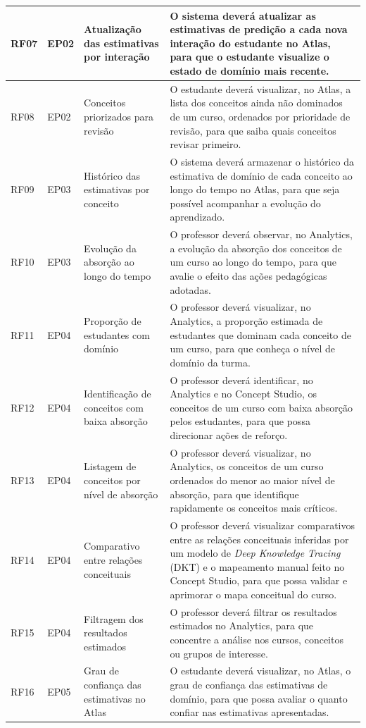 {\begin{longtable}{>{\raggedright\arraybackslash}p{1.4cm}>{\raggedright\arraybackslash}p{2.0cm}>{\raggedright\arraybackslash}p{3.4cm}>{\raggedright\arraybackslash}p{7.0cm}}
\hline
RF07 & EP02 & Atualização das estimativas por interação & O sistema deverá atualizar as estimativas de predição a cada nova interação do estudante no Atlas, para que o estudante visualize o estado de domínio mais recente. \\
\hline
RF08 & EP02 & Conceitos priorizados para revisão & O estudante deverá visualizar, no Atlas, a lista dos conceitos ainda não dominados de um curso, ordenados por prioridade de revisão, para que saiba quais conceitos revisar primeiro. \\
\hline
RF09 & EP03 & Histórico das estimativas por conceito & O sistema deverá armazenar o histórico da estimativa de domínio de cada conceito ao longo do tempo no Atlas, para que seja possível acompanhar a evolução do aprendizado. \\
\hline
RF10 & EP03 & Evolução da absorção ao longo do tempo & O professor deverá observar, no Analytics, a evolução da absorção dos conceitos de um curso ao longo do tempo, para que avalie o efeito das ações pedagógicas adotadas. \\
\hline
RF11 & EP04 & Proporção de estudantes com domínio & O professor deverá visualizar, no Analytics, a proporção estimada de estudantes que dominam cada conceito de um curso, para que conheça o nível de domínio da turma. \\
\hline
RF12 & EP04 & Identificação de conceitos com baixa absorção & O professor deverá identificar, no Analytics e no Concept Studio, os conceitos de um curso com baixa absorção pelos estudantes, para que possa direcionar ações de reforço. \\
\hline
RF13 & EP04 & Listagem de conceitos por nível de absorção & O professor deverá visualizar, no Analytics, os conceitos de um curso ordenados do menor ao maior nível de absorção, para que identifique rapidamente os conceitos mais críticos. \\
\hline
RF14 & EP04 & Comparativo entre relações conceituais & O professor deverá visualizar comparativos entre as relações conceituais inferidas por um modelo de \textit{Deep Knowledge Tracing} (DKT) e o mapeamento manual feito no Concept Studio, para que possa validar e aprimorar o mapa conceitual do curso. \\
\hline
RF15 & EP04 & Filtragem dos resultados estimados & O professor deverá filtrar os resultados estimados no Analytics, para que concentre a análise nos cursos, conceitos ou grupos de interesse. \\
\hline
RF16 & EP05 & Grau de confiança das estimativas no Atlas & O estudante deverá visualizar, no Atlas, o grau de confiança das estimativas de domínio, para que possa avaliar o quanto confiar nas estimativas apresentadas. \\

\end{longtable}}
